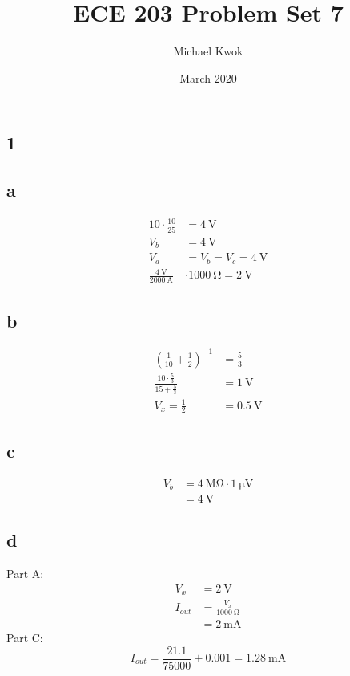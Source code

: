 \documentclass{article}
\title{ECE 203 Problem Set 7}
\author{Michael Kwok}
\date{March 2020}
\begin{document}
\maketitle
\begin{multicols}{2}
\section*{1}
\subsection*{a}

\begin{align*}
10 \cdot \frac{10}{25} &= \SI{4}{\volt}\\
V_b &= \SI{4}{\volt}\\
V_a &= V_b = V_c = \SI{4}{\volt}\\
\frac{\SI{4}{\volt}}{\SI{2000}{\ampere}} &\cdot \SI{1000}{\ohm} = \SI{2}{\volt}
\end{align*}

\subsection*{b}

\begin{align*}
\left(\frac{1}{10} + \frac{1}{2}\right)^{-1} &= \frac{5}{3}\\
\frac{10\cdot\frac{5}{3}}{15+\frac{5}{3}} &= \SI{1}{\volt}\\
V_x = \frac{1}{2} &= \boxed{\SI{0.5}{\volt}}
\end{align*}

\subsection*{c}
\begin{align*}
    V_b &= \SI{4}{\mega\ohm} \cdot \SI{1}{\micro\volt}\\
    &= \SI{4}{\volt}
\end{align*}
\subsection*{d}
Part A:
\begin{align*}
    V_x &= \SI{2}{\volt}\\
    I_{out} &= \frac{V_x}{\SI{1000}{\ohm}}\\
    &= \SI{2}{\milli\ampere}
\end{align*}
Part C:
$$
I_{out} = \frac{21.1}{75000} + 0.001 = \SI{1.28}{\milli\ampere}
$$

\end{multicols}
\end{document}
